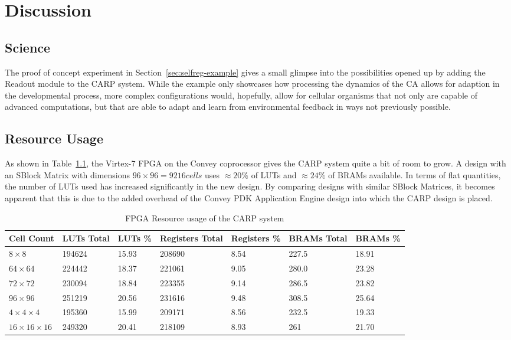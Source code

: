 \chapter{Discussion}

\section{Science}

The proof of concept experiment in Section~\ref{sec:selfreg-example} gives a
small glimpse into the possibilities opened up by adding the Readout module
to the CARP system. While the example only showcases how processing the dynamics
of the CA allows for adaption in the developmental process, more complex
configurations would, hopefully, allow for cellular organisms that not only are
capable of advanced computations, but that are able to adapt and learn from
environmental feedback in ways not previously possible.

\section{Resource Usage}


As shown in Table~\ref{tbl:resource-usage}, the Virtex-7 FPGA on the Convey
coprocessor gives the CARP system quite a bit of room to grow. A design with an
SBlock Matrix with dimensions $96\times96 = 9216 cells$ uses $\approx 20\%$ of LUTs
and $\approx 24\%$ of BRAMs available. In terms of flat quantities, the number
of LUTs used has increased significantly in the new design. By comparing designs
with similar SBlock Matrices, it becomes apparent that this is due to the added
overhead of the Convey PDK Application Engine design into which the CARP design
is placed.


\renewcommand{\arraystretch}{1.2}
\begin{table}[ht]
  \centering
  \begin{tabularx}{\linewidth}{X|X|X|X|X|X|X}
    Cell Count & LUTs Total & LUTs \% & Registers Total & Registers \% & BRAMs Total & BRAMs \%\\
    \hline
    $8\times8$ & 194624 & 15.93 & 208690 & 8.54 & 227.5 & 18.91\\ 
    \hline
    $64\times64$ & 224442 & 18.37 & 221061 & 9.05 & 280.0 & 23.28\\
    \hline
    $72\times72$ & 230094 & 18.84 & 223355 & 9.14 & 286.5 & 23.82\\
    \hline
    $96\times96$ & 251219 & 20.56 & 231616 & 9.48 & 308.5 & 25.64\\
    \hline
    $4\times4\times4$ & 195360 & 15.99 & 209171 & 8.56 & 232.5 & 19.33\\
    \hline
    $16\times16\times16$ & 249320 & 20.41 & 218109 & 8.93 & 261 & 21.70\\
  \end{tabularx}
  \caption{FPGA Resource usage of the CARP system}\label{tbl:resource-usage}
\end{table}

